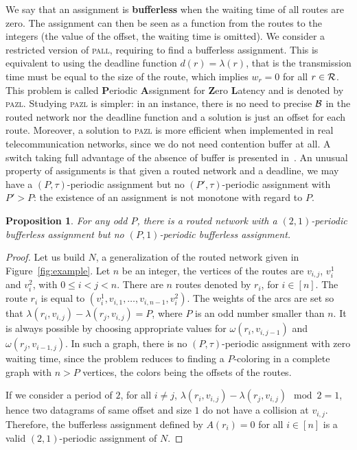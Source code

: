 \documentclass[a4paper,10pt]{journal}
\newtheorem{proposition}{Proposition}
\newcommand\pazl{\textsc{pazl}\xspace}
\newcommand\pall{\textsc{pall}\xspace}
\begin{document}
	 We say that an assignment is \textbf{bufferless} when the waiting time of all routes are zero.
	 The assignment can then be seen as a function from the routes to the integers (the value of the offset, the waiting time is omitted). We consider a restricted version of \pall, requiring to find a bufferless assignment. This is equivalent to using the deadline function $d(r) = \lambda(r)$, that is the transmission time must be equal to the size of the route, which implies $w_r = 0$ for all $r \in \cal{R}$. This problem is called \textbf{P}eriodic \textbf{A}ssignment for \textbf{Z}ero \textbf{L}atency and is denoted by \pazl. Studying \pazl is simpler: in an instance, there is no need to precise $\cal{B}$ in the routed network nor the deadline function and a solution is just an offset for each route.  Moreover, a solution to \pazl is more efficient when implemented in real telecommunication networks, since we do not need contention buffer at all. A switch taking full advantage of the absence of buffer is presented in~\cite{Marc2201:Experimental}. 
      An unusual property of assignments is that given a routed network and a deadline, we may have a $(P,\tau)$-periodic assignment but no $(P',\tau)$-periodic assignment with $P' > P$: the existence of an assignment is not monotone with regard to $P$.

	\begin{proposition} \label{prop:monotonic}
	 For any odd $P$, there is a routed network with a $(2,1)$-periodic bufferless assignment but no $(P,1)$-periodic bufferless assignment.
	\end{proposition}

	\begin{proof}
      Let us build $N$, a generalization of the routed network given in Figure~\ref{fig:example}. 
      Let $n$ be an integer, the vertices of the routes are $v_{i,j}$, $v_i^1$ and $v_i^2$, with $0 \leq i < j <n$. 
      There are $n$ routes denoted by $r_i$, for $i \in [n]$. The route $r_i$ is equal to $(v_i^1,v_{i,1},\dots,v_{i,n-1},v_i^2)$. The weights of the arcs are set so that $\lambda(r_i, v_{i,j}) - \lambda(r_j,v_{i,j})= P$, where $P$ is an odd number smaller than $n$. It is always possible by choosing appropriate values for $\omega(r_i,v_{i,j-1})$ and $\omega(r_j,v_{i-1,j})$. In such a graph, there is no $(P,\tau)$-periodic assignment with zero waiting time, since the problem reduces to finding a $P$-coloring in a complete graph with $n > P$ vertices, the colors being the offsets of the routes.


      If we consider a period of $2$, for all $i \neq j$, $\lambda(r_i, v_{i,j}) - \lambda(r_j, v_{i,j}) \mod 2 = 1$, hence two datagrams of same offset and size $1$ do not have a collision at $v_{i,j}$. Therefore, the bufferless assignment defined by $A(r_i) = 0$ for all $i \in [n]$ is a valid $(2,1)$-periodic assignment of $N$.      
\end{proof}
\end{document}
